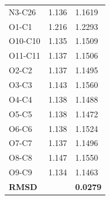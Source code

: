 \begin{table}[]
\begin{tabular}{lcl}
N3-C26 & 1.136 & 1.1619 \\
O1-C1 & 1.216 & 1.2293 \\
O10-C10 & 1.135 & 1.1509 \\
O11-C11 & 1.137 & 1.1506 \\
O2-C2 & 1.137 & 1.1495 \\
O3-C3 & 1.143 & 1.1560 \\
O4-C4 & 1.138 & 1.1488 \\
O5-C5 & 1.138 & 1.1472 \\
O6-C6 & 1.138 & 1.1524 \\
O7-C7 & 1.137 & 1.1496 \\
O8-C8 & 1.147 & 1.1550 \\
O9-C9 & 1.134 & 1.1463 \\ \hline
\textbf{RMSD} &  & \textbf{0.0279}
\end{tabular}
\end{table}


